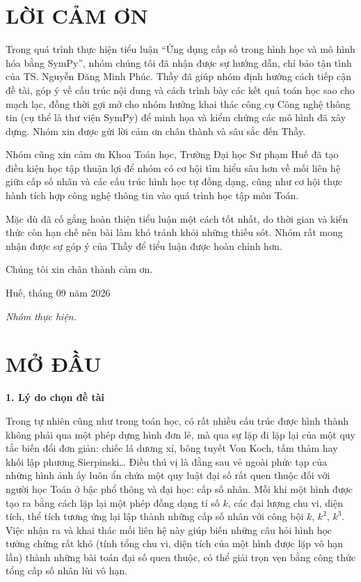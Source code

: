 \documentclass[12pt,a4paper,oneside]{book}
\theoremstyle{theorem}
\theoremstyle{definition}
\begin{document}
\chapter*{LỜI CẢM ƠN}
\fontsize{13pt}{22pt}\selectfont

Trong quá trình thực hiện tiểu luận ``Ứng dụng cấp số trong hình học và mô hình hóa bằng SymPy'', nhóm chúng tôi đã nhận được sự hướng dẫn, chỉ bảo tận tình của TS. Nguyễn Đăng Minh Phúc. Thầy đã giúp nhóm định hướng cách tiếp cận đề tài, góp ý về cấu trúc nội dung và cách trình bày các kết quả toán học sao cho mạch lạc, đồng thời gợi mở cho nhóm hướng khai thác công cụ Công nghệ thông tin (cụ thể là thư viện SymPy) để minh họa và kiểm chứng các mô hình đã xây dựng. Nhóm xin được gửi lời cảm ơn chân thành và sâu sắc đến Thầy.

Nhóm cũng xin cảm ơn Khoa Toán học, Trường Đại học Sư phạm Huế đã tạo điều kiện học tập thuận lợi để nhóm có cơ hội tìm hiểu sâu hơn về mối liên hệ giữa cấp số nhân và các cấu trúc hình học tự đồng dạng, cũng như cơ hội thực hành tích hợp công nghệ thông tin vào quá trình học tập môn Toán.

Mặc dù đã cố gắng hoàn thiện tiểu luận một cách tốt nhất, do thời gian và kiến thức còn hạn chế nên bài làm khó tránh khỏi những thiếu sót. Nhóm rất mong nhận được sự góp ý của Thầy để tiểu luận được hoàn chỉnh hơn.

Chúng tôi xin chân thành cảm ơn.

\begin{flushright}
Huế, tháng 09 năm 2026

\textit{Nhóm thực hiện.}
\end{flushright}

\chapter*{MỞ ĐẦU}
\fontsize{13pt}{18pt}\selectfont
\setlength{\baselineskip}{26truept}

\noindent\textbf{1. Lý do chọn đề tài}

Trong tự nhiên cũng như trong toán học, có rất nhiều cấu trúc được hình thành không phải qua một phép dựng hình đơn lẻ, mà qua sự lặp đi lặp lại của một quy tắc biến đổi đơn giản: chiếc lá dương xỉ, bông tuyết Von Koch, tấm thảm hay khối lập phương Sierpinski\ldots{} Điều thú vị là đằng sau vẻ ngoài phức tạp của những hình ảnh ấy luôn ẩn chứa một quy luật đại số rất quen thuộc đối với người học Toán ở bậc phổ thông và đại học: cấp số nhân. Mỗi khi một hình được tạo ra bằng cách lặp lại một phép đồng dạng tỉ số $k$, các đại lượng chu vi, diện tích, thể tích tương ứng lại lập thành những cấp số nhân với công bội $k$, $k^2$, $k^3$. Việc nhận ra và khai thác mối liên hệ này giúp biến những câu hỏi hình học tưởng chừng rất khó (tính tổng chu vi, diện tích của một hình được lặp vô hạn lần) thành những bài toán đại số quen thuộc, có thể giải trọn vẹn bằng công thức tổng cấp số nhân lùi vô hạn.
\end{document}
